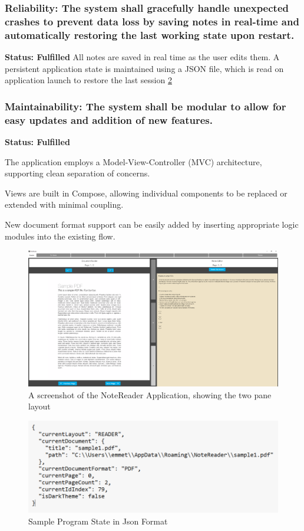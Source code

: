     
        \subsubsection { Reliability: The system shall gracefully handle unexpected crashes to prevent data loss by saving notes in real-time and automatically restoring the last working state upon restart.}
        \textbf{Status: Fulfilled}
        All notes are saved in real time as the user edits them.
        A persistent application state is maintained using a JSON file, which is read on application launch to restore the last session \ref{fig:state_json}

         
        \subsubsection { Maintainability: The system shall be modular to allow for easy updates and addition of new features.}
        \textbf{Status: Fulfilled}

        The application employs a Model-View-Controller (MVC) architecture, supporting clean separation of concerns. 
        
        Views are built in Compose, allowing individual components to be replaced or extended with minimal coupling. 
        
        New document format support can be easily added by inserting appropriate logic modules into the existing flow.
        

\begin{figure}
    \centering
    \includegraphics[width=1\linewidth]{image.png}
    \caption{A screenshot of the NoteReader Application, showing the two pane layout}
    \label{fig:notereader_twopane}
\end{figure}    

\begin{figure}
    \centering
    \includegraphics[width=1\linewidth]{state_json.png}
    \caption{Sample Program State in Json Format}
    \label{fig:state_json}
\end{figure}

